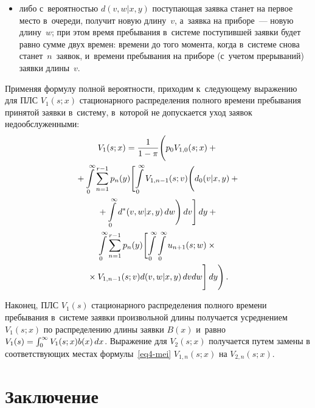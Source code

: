 \begin{multicols}{2}
\begin{itemize}
\item либо с~вероятностью $d(v,w|x,y)$ поступающая заявка станет на первое место 
в~очереди, получит новую длину~$v$, а~заявка на приборе~--- новую длину~$w$; 
при этом время пребывания в~системе поступившей заявки будет равно сумме двух 
времен: времени до того момента, когда в~системе снова станет~$n$~заявок, 
и~времени пребывания на приборе (с~учетом прерываний) заявки длины~$v$.
\end{itemize}

Применяя формулу полной вероятности, приходим к~следующему выражению для ПЛС $V_1(s;x)$
стационарного распределения полного времени пребывания принятой заявки в~систему, в~которой
не допускается уход заявок недообслуженными:
\begin{multline}
\label{eq4-mei}
V_1(s;x)= \displaystyle\frac{\displaystyle 1\mathstrut}{\displaystyle 1-\pi\mathstrut}
\Biggl (
p_0 V_{1,0}(s;x) +{}
\\ 
{}+
\int\limits_0^\infty  \sum\limits_{n=1}^{r-1} p_n(y)
\Biggl [
\int\limits_0^\infty V_{1,n-1}(s;v)
\Biggl ( d_0(v|x,y)+{}\\
{}+\int\limits_0^\infty d^*(v,w|x,y)\,dw \Biggr ) \,dv
\Biggr ]\, dy
+{}\\
\int\limits_0^\infty  \sum\limits_{n=1}^{r-1} p_n(y)
\Biggl [
\int\limits_0^\infty 
\int\limits_0^\infty u_{n+1}(s;w) \times{}\\
{}\times V_{1,n-1}(s;v) d(v,w|x,y) \,dv  dw
\Biggr ]\,dy
\Biggr )\,.
\end{multline}

Наконец, ПЛС $V_1(s)$ стационарного распределения полного
времени пребывания в~системе заявки произвольной длины
получается усреднением $V_1(s;x)$ по распределению длины заявки $B(x)$ и~равно
$V_1(s)\hm=\int_0^\infty V_1(s;x)b(x)\,dx$.
Выражение для $V_2(s;x)$ получается путем замены
в соответству\-ющих местах формулы~\eqref{eq4-mei} $V_{1,n}(s;x)$
на $V_{2,n}(s;x)$.

\section{Заключение}


\end{multicols}
